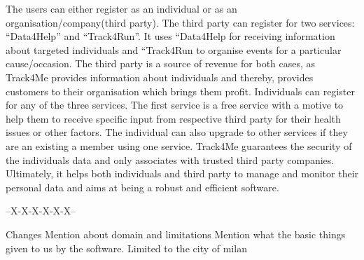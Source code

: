 The users can either register as an individual or as an organisation/company(third party). The third party can register for two services: “Data4Help” and “Track4Run”. It uses “Data4Help for receiving information about targeted individuals and “Track4Run to organise events for a particular cause/occasion. The third party is a source of revenue for both cases, as Track4Me provides information about individuals and thereby,  provides customers to their organisation which brings them profit. Individuals can register for any of the three services. The first service is a free service  with a motive to help them to receive specific input from respective third party for their health issues or other factors. The individual can also upgrade to other services if they are an existing a member using one service. Track4Me guarantees the security of the individuals data and only associates with trusted third party companies. Ultimately, it helps both individuals and third party to manage and monitor their personal data and aims at being a robust and efficient software.


--X-X-X-X-X-X--

Changes
Mention about domain and limitations
Mention what the basic things given to us by the software.
Limited to the city of milan
